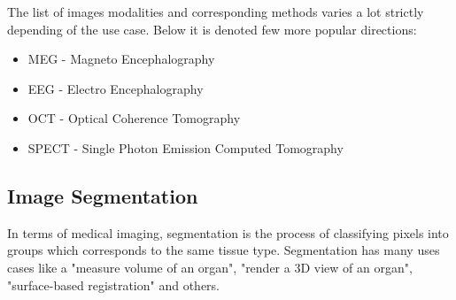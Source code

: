 The list of images modalities and corresponding methods varies a lot strictly depending of the use case.
Below it is denoted few more popular directions:
\begin{itemize}
    \item MEG - Magneto Encephalography
    \item EEG - Electro Encephalography
    \item OCT - Optical Coherence Tomography
    \item SPECT - Single Photon Emission Computed Tomography
\end{itemize}


\subsection{Image Segmentation}
In terms of medical imaging, segmentation is the process of classifying pixels into groups which corresponds to the same tissue type. Segmentation has many uses cases like a "measure volume of an organ", "render a 3D view of an organ", "surface-based registration" and others.
  
